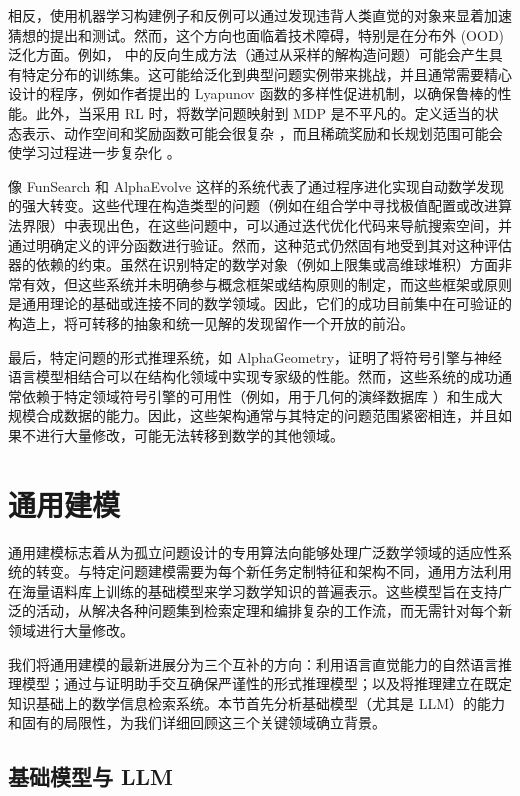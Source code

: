 \documentclass[11pt]{article}
\numberwithin{equation}{section}
\begin{document}
相反，使用机器学习构建例子和反例可以通过发现违背人类直觉的对象来显着加速猜想的提出和测试。然而，这个方向也面临着技术障碍，特别是在分布外 (OOD) 泛化方面。例如，\cite{alfarano2024global} 中的反向生成方法（通过从采样的解构造问题）可能会产生具有特定分布的训练集。这可能给泛化到典型问题实例带来挑战，并且通常需要精心设计的程序，例如作者提出的 Lyapunov 函数的多样性促进机制，以确保鲁棒的性能。此外，当采用 RL 时，将数学问题映射到 MDP 是不平凡的。定义适当的状态表示、动作空间和奖励函数可能会很复杂 \cite{wagner2021constructions}，而且稀疏奖励和长规划范围可能会使学习过程进一步复杂化 \cite{shehper2025what}。

像 FunSearch 和 AlphaEvolve 这样的系统代表了通过程序进化实现自动数学发现的强大转变。这些代理在构造类型的问题（例如在组合学中寻找极值配置或改进算法界限）中表现出色，在这些问题中，可以通过迭代优化代码来导航搜索空间，并通过明确定义的评分函数进行验证。然而，这种范式仍然固有地受到其对这种评估器的依赖的约束。虽然在识别特定的数学对象（例如上限集或高维球堆积）方面非常有效，但这些系统并未明确参与概念框架或结构原则的制定，而这些框架或原则是通用理论的基础或连接不同的数学领域。因此，它们的成功目前集中在可验证的构造上，将可转移的抽象和统一见解的发现留作一个开放的前沿。

最后，特定问题的形式推理系统，如 AlphaGeometry，证明了将符号引擎与神经语言模型相结合可以在结构化领域中实现专家级的性能。然而，这些系统的成功通常依赖于特定领域符号引擎的可用性（例如，用于几何的演绎数据库 \cite{chou2000deductive}）和生成大规模合成数据的能力。因此，这些架构通常与其特定的问题范围紧密相连，并且如果不进行大量修改，可能无法转移到数学的其他领域。

\section{通用建模}\label{sec:grm}

通用建模标志着从为孤立问题设计的专用算法向能够处理广泛数学领域的适应性系统的转变。与特定问题建模需要为每个新任务定制特征和架构不同，通用方法利用在海量语料库上训练的基础模型来学习数学知识的普遍表示。这些模型旨在支持广泛的活动，从解决各种问题集到检索定理和编排复杂的工作流，而无需针对每个新领域进行大量修改。

我们将通用建模的最新进展分为三个互补的方向：利用语言直觉能力的自然语言推理模型；通过与证明助手交互确保严谨性的形式推理模型；以及将推理建立在既定知识基础上的数学信息检索系统。本节首先分析基础模型（尤其是 LLM）的能力和固有的局限性，为我们详细回顾这三个关键领域确立背景。

\subsection{基础模型与 LLM}
\end{document}
